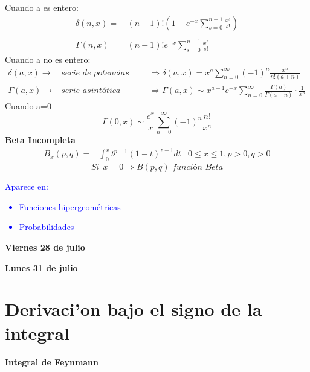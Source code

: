 \documentclass{article}
\theoremstyle{definition}
\begin{document}
Cuando a es entero:
\[
\begin{array}{rl}
	\delta (n,x)=& (n-1)!\left(1-e^{-x}\sum^{n-1}_{s=0}\frac{x^s}{s!}\right)\\
	\\
	\Gamma (n,x)=&(n-1)!e^{-x}\sum^{n-1}_{s=0}\frac{x^s}{s!}
\end{array}
\]
Cuando a no es entero:
\[
\begin{array}{rll}
	\delta (a,x)\rightarrow & \textit{serie de potencias para x pequeno} &\Rightarrow \delta (a,x)=x^a\sum^{\infty}_{n=0}(-1)^n\frac{x^n}{n!(a+n)}\\
	\Gamma (a,x)\rightarrow & \textit{serie asintótica} &\Rightarrow \Gamma (a,x)\sim x^{a-1}e^{-x}\sum^{\infty}_{n=0}\frac{\Gamma (a)}{\Gamma (a-n)}\cdot\frac{1}{x^n}
\end{array}
\]
Cuando a=0
\[\Gamma (0,x)\sim \frac{e^x}{x}\sum^{\infty}_{n=0}(-1)^n \frac{n!}{x^n}\]
\textbf{\underline{Beta Incompleta}}
\[
\begin{array}{rlr}
	B_x (p,q)=&\int^{x}_0t^{p-1}(1-t)^{z-1}dt
	& 0\leq x\leq 1,p>0,q>0
\end{array}
\]
\[Si\ \ x=0\Rightarrow B(p,q) \textit{  función Beta}\]
\textcolor{blue}{Aparece en:
\begin{itemize}
	\item Funciones hipergeométricas
	\item Probabilidades
\end{itemize}}

\newpage
\textbf{Viernes 28 de julio}

\newpage
\textbf{Lunes 31 de julio}
\section*{Derivaci'on bajo el signo de la integral}
\textbf{Integral de Feynmann}
\end{document}
